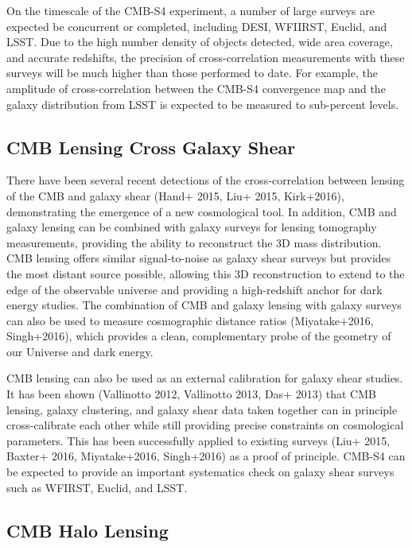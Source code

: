 \documentclass{tcibook}
\begin{document}
On the timescale of the CMB-S4 experiment, a number of large surveys are expected be concurrent or completed, including DESI, WFIIRST, Euclid, and LSST.  Due to the high number density of objects detected, wide area coverage, and accurate redshifts, the precision of cross-correlation measurements with these surveys will be much higher than those performed to date.  For example, the amplitude of cross-correlation between the CMB-S4 convergence map and the galaxy distribution from LSST is expected to be measured to sub-percent levels.  


\subsection{CMB Lensing Cross Galaxy Shear}\label{lensxlens}


There have been several recent detections of the cross-correlation between lensing of the CMB and galaxy shear (Hand+ 2015, Liu+ 2015, Kirk+2016), demonstrating the emergence of a new cosmological tool. In addition, CMB and galaxy lensing can be combined with galaxy surveys for lensing tomography measurements, providing the ability to reconstruct the 3D mass distribution. CMB lensing offers similar signal-to-noise as galaxy shear surveys but provides the most distant source possible, allowing this 3D reconstruction to extend to the edge of the observable universe and providing a high-redshift anchor for dark energy studies.  The combination of CMB and galaxy lensing with galaxy surveys can also be used to measure cosmographic distance ratios (Miyatake+2016, Singh+2016), which provides a clean, complementary probe of the geometry of our Universe and dark energy. 

CMB lensing can also be used as an external calibration for galaxy shear studies. It has been shown (Vallinotto 2012, Vallinotto 2013, Das+ 2013) that CMB lensing, galaxy clustering, and galaxy shear data taken together can in principle cross-calibrate each other while still providing precise constraints on cosmological parameters. This has been successfully applied to existing surveys (Liu+ 2015, Baxter+ 2016, Miyatake+2016, Singh+2016) as a proof of principle. CMB-S4 can be expected to provide an important systematics check on galaxy shear surveys such as WFIRST, Euclid, and LSST. 

\subsection{CMB Halo Lensing}\label{haloLensing}
\end{document}
